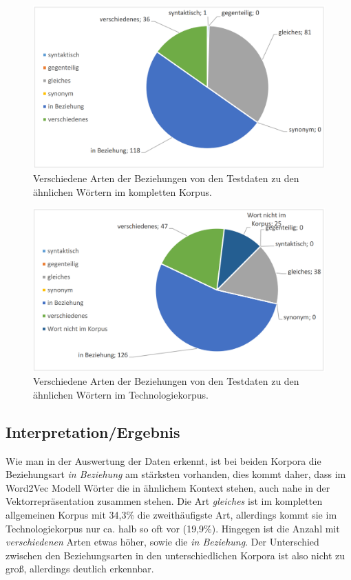 \documentclass[12pt,a4paper]{report}
\begin{document}
\begin{figure}[p]
  \begin{center}
	\includegraphics[scale=0.4]{BeziehungsartenFull.PNG}
  \end{center}  
  \caption{Verschiedene Arten der Beziehungen von den Testdaten zu den ähnlichen Wörtern im kompletten Korpus.}

\end{figure}
\begin{figure}[p]
  \begin{center}
	\includegraphics[scale=0.4]{BeziehungsartenTech.PNG}
  \end{center}  
  \caption{Verschiedene Arten der Beziehungen von den Testdaten zu den ähnlichen Wörtern im Technologiekorpus.}
  \end{figure}			
		
		
		\subsection{Interpretation/Ergebnis}
		Wie man in der Auswertung der Daten erkennt, ist bei beiden Korpora die Beziehungsart \textit{in Beziehung} am stärksten vorhanden, dies kommt daher, dass im Word2Vec Modell Wörter die in ähnlichem Kontext stehen, auch nahe in der Vektorrepräsentation zusammen stehen. Die Art \textit{gleiches} ist im kompletten allgemeinen Korpus mit 34,3\% die zweithäufigste Art, allerdings kommt sie im Technologiekorpus nur ca. halb so oft vor (19,9\%). Hingegen ist die Anzahl mit \textit{verschiedenen} Arten etwas höher, sowie die \textit{in Beziehung}. Der Unterschied zwischen den Beziehungsarten in den unterschiedlichen Korpora ist also nicht zu groß, allerdings deutlich erkennbar.\\
		
\end{document}
